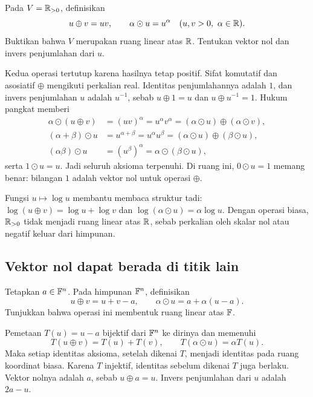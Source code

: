 \begin{exam}
    Pada $V=\mathbb{R}_{>0}$, definisikan
    \[
        u\oplus v=uv,\qquad \alpha\odot u=u^\alpha
        \quad(u,v>0,\ \alpha\in\mathbb{R}).
    \]
    Buktikan bahwa $V$ merupakan ruang linear atas $\mathbb{R}$.
    Tentukan vektor nol dan invers penjumlahan dari $u$.
\end{exam}
\begin{solution}
    Kedua operasi tertutup karena hasilnya tetap positif.
    Sifat komutatif dan asosiatif $\oplus$ mengikuti perkalian real.
    Identitas penjumlahannya adalah $1$, dan invers penjumlahan $u$
    adalah $u^{-1}$, sebab $u\oplus1=u$ dan $u\oplus u^{-1}=1$.
    Hukum pangkat memberi
    \begin{align*}
        \alpha\odot(u\oplus v)
         & =(uv)^\alpha=u^\alpha v^\alpha
        =(\alpha\odot u)\oplus(\alpha\odot v), \\
        (\alpha+\beta)\odot u
         & =u^{\alpha+\beta}=u^\alpha u^\beta
        =(\alpha\odot u)\oplus(\beta\odot u),  \\
        (\alpha\beta)\odot u
         & =(u^\beta)^\alpha
        =\alpha\odot(\beta\odot u),
    \end{align*}
    serta $1\odot u=u$. Jadi seluruh aksioma terpenuhi.
    Di ruang ini, $0\odot u=1$ memang benar: bilangan $1$
    adalah vektor nol untuk operasi $\oplus$.
\end{solution}

Fungsi $u\mapsto\log u$ membantu membaca struktur tadi:
$\log(u\oplus v)=\log u+\log v$ dan
$\log(\alpha\odot u)=\alpha\log u$.
Dengan operasi biasa, $\mathbb{R}_{>0}$ tidak menjadi ruang linear atas
$\mathbb{R}$, sebab perkalian oleh skalar nol atau negatif keluar dari himpunan.

\subsection{Vektor nol dapat berada di titik lain}

\begin{exam}
    Tetapkan $a\in\mathbb{F}^n$. Pada himpunan $\mathbb{F}^n$, definisikan
    \[
        u\oplus v=u+v-a,\qquad
        \alpha\odot u=a+\alpha(u-a).
    \]
    Tunjukkan bahwa operasi ini membentuk ruang linear atas $\mathbb{F}$.
\end{exam}
\begin{solution}
    Pemetaan $T(u)=u-a$ bijektif dari $\mathbb{F}^n$ ke dirinya dan memenuhi
    \[
        T(u\oplus v)=T(u)+T(v),\qquad
        T(\alpha\odot u)=\alpha T(u).
    \]
    Maka setiap identitas aksioma, setelah dikenai $T$, menjadi
    identitas pada ruang koordinat biasa. Karena $T$ injektif,
    identitas sebelum dikenai $T$ juga berlaku.
    Vektor nolnya adalah $a$, sebab $u\oplus a=u$.
    Invers penjumlahan dari $u$ adalah $2a-u$.
\end{solution}

